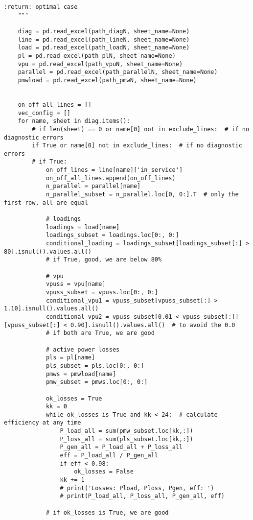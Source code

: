 \begin{lstlisting}[caption={Main code in Python with the Pandapower library}]
    :return: optimal case
    """

    diag = pd.read_excel(path_diagN, sheet_name=None)
    line = pd.read_excel(path_lineN, sheet_name=None)
    load = pd.read_excel(path_loadN, sheet_name=None)
    pl = pd.read_excel(path_plN, sheet_name=None)
    vpu = pd.read_excel(path_vpuN, sheet_name=None)
    parallel = pd.read_excel(path_parallelN, sheet_name=None)
    pmwload = pd.read_excel(path_pmwN, sheet_name=None)


    on_off_all_lines = []
    vec_config = []
    for name, sheet in diag.items():
        # if len(sheet) == 0 or name[0] not in exclude_lines:  # if no diagnostic errors
        if True or name[0] not in exclude_lines:  # if no diagnostic errors
        # if True:
            on_off_lines = line[name]['in_service']
            on_off_all_lines.append(on_off_lines)
            n_parallel = parallel[name]
            n_parallel_subset = n_parallel.loc[0, 0:].T  # only the first row, all are equal

            # loadings
            loadings = load[name]
            loadings_subset = loadings.loc[0:, 0:]
            conditional_loading = loadings_subset[loadings_subset[:] > 80].isnull().values.all()
            # if True, good, we are below 80%

            # vpu
            vpuss = vpu[name]
            vpuss_subset = vpuss.loc[0:, 0:]
            conditional_vpu1 = vpuss_subset[vpuss_subset[:] > 1.10].isnull().values.all()
            conditional_vpu2 = vpuss_subset[0.01 < vpuss_subset[:]][vpuss_subset[:] < 0.90].isnull().values.all()  # to avoid the 0.0 
            # if both are True, we are good

            # active power losses
            pls = pl[name]
            pls_subset = pls.loc[0:, 0:]
            pmws = pmwload[name]
            pmw_subset = pmws.loc[0:, 0:]

            ok_losses = True
            kk = 0
            while ok_losses is True and kk < 24:  # calculate efficiency at any time
                P_load_all = sum(pmw_subset.loc[kk,:])
                P_loss_all = sum(pls_subset.loc[kk,:])
                P_gen_all = P_load_all + P_loss_all
                eff = P_load_all / P_gen_all
                if eff < 0.98:
                    ok_losses = False
                kk += 1
                # print('Losses: Pload, Ploss, Pgen, eff: ')
                # print(P_load_all, P_loss_all, P_gen_all, eff)

            # if ok_losses is True, we are good


\end{lstlisting}
